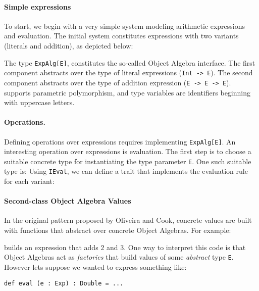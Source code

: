 \paragraph{Simple expressions}
To start, we begin with a very simple system modeling arithmetic expressions and
evaluation. The initial system constitutes expressions with two variants
(literals and addition), as depicted below:

\noindent The type \lstinline{ExpAlg[E]}, constitutes the so-called Object
Algebra interface. The first component abstracts over the type of literal
expressions (\lstinline{Int -> E}). The second component abstracts over the type
of addition expression (\lstinline{E -> E -> E}). \name supports parametric
polymorphism, and type variables are identifiers beginning with uppercase
letters.

\paragraph{Operations.} Defining operations over expressions requires
implementing \lstinline{ExpAlg[E]}. An interesting operation over expressions is
evaluation. The first step is to choose a suitable concrete type for
instantiating the type parameter \lstinline{E}. One such suitable type is:
Using \lstinline{IEval}, we can define a trait that implements the evaluation
rule for each variant:

\paragraph{Second-class Object Algebra Values} In the original pattern
proposed by Oliveira and Cook, concrete values are built with
functions that abstract over concrete Object Algebras. For example:


\noindent builds an expression that adds $2$ and $3$. One way to
interpret this code is that Object Algebras act as \emph{factories}
that build values of some \emph{abstract} type \lstinline{E}. However
lets suppose we wanted to express something like:

\begin{lstlisting}
def eval (e : Exp) : Double = ...
\end{lstlisting}

